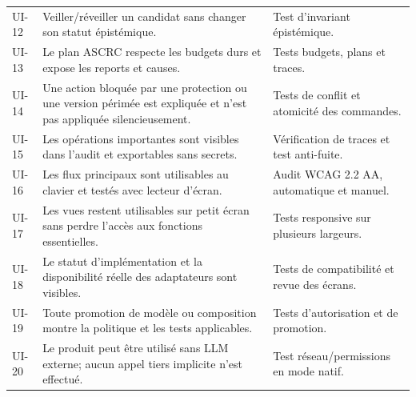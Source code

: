 \documentclass[11pt,a4paper]{article}
\begin{document}
\begin{longtable}{p{}p{}p{}}
UI-12 & Veiller/réveiller un candidat sans changer son statut épistémique. & Test d'invariant épistémique.\\
UI-13 & Le plan ASCRC respecte les budgets durs et expose les reports et causes. & Tests budgets, plans et traces.\\
UI-14 & Une action bloquée par une protection ou une version périmée est expliquée et n'est pas appliquée silencieusement. & Tests de conflit et atomicité des commandes.\\
UI-15 & Les opérations importantes sont visibles dans l'audit et exportables sans secrets. & Vérification de traces et test anti-fuite.\\
UI-16 & Les flux principaux sont utilisables au clavier et testés avec lecteur d'écran. & Audit WCAG 2.2 AA, automatique et manuel.\\
UI-17 & Les vues restent utilisables sur petit écran sans perdre l'accès aux fonctions essentielles. & Tests responsive sur plusieurs largeurs.\\
UI-18 & Le statut d'implémentation et la disponibilité réelle des adaptateurs sont visibles. & Tests de compatibilité et revue des écrans.\\
UI-19 & Toute promotion de modèle ou composition montre la politique et les tests applicables. & Tests d'autorisation et de promotion.\\
UI-20 & Le produit peut être utilisé sans LLM externe; aucun appel tiers implicite n'est effectué. & Test réseau/permissions en mode natif.\\
\bottomrule
\end{longtable}
\end{document}
